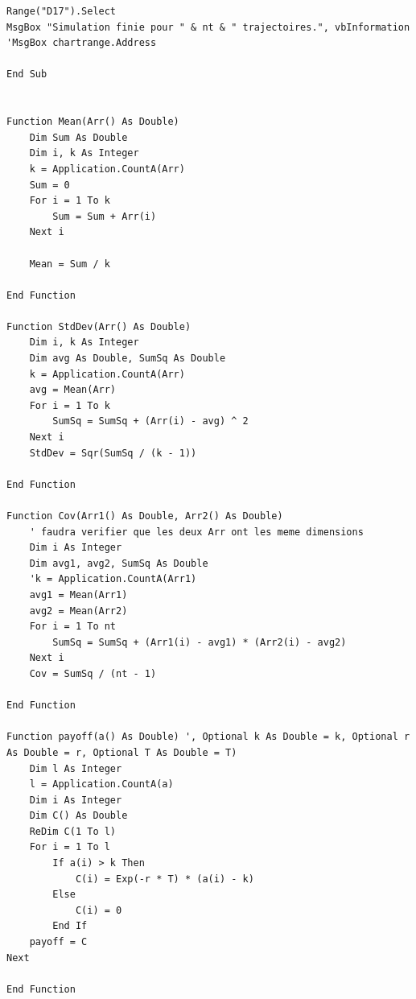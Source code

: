 \documentclass[a4paper,12pt]{scrartcl}
\begin{document}
\begin{lstlisting}
Range("D17").Select
MsgBox "Simulation finie pour " & nt & " trajectoires.", vbInformation
'MsgBox chartrange.Address

End Sub


Function Mean(Arr() As Double)
    Dim Sum As Double
    Dim i, k As Integer
    k = Application.CountA(Arr)
    Sum = 0
    For i = 1 To k
        Sum = Sum + Arr(i)
    Next i
 
    Mean = Sum / k

End Function

Function StdDev(Arr() As Double)
    Dim i, k As Integer
    Dim avg As Double, SumSq As Double
    k = Application.CountA(Arr)
    avg = Mean(Arr)
    For i = 1 To k
        SumSq = SumSq + (Arr(i) - avg) ^ 2
    Next i
    StdDev = Sqr(SumSq / (k - 1))

End Function

Function Cov(Arr1() As Double, Arr2() As Double)
    ' faudra verifier que les deux Arr ont les meme dimensions
    Dim i As Integer
    Dim avg1, avg2, SumSq As Double
    'k = Application.CountA(Arr1)
    avg1 = Mean(Arr1)
    avg2 = Mean(Arr2)
    For i = 1 To nt
        SumSq = SumSq + (Arr1(i) - avg1) * (Arr2(i) - avg2)
    Next i
    Cov = SumSq / (nt - 1)

End Function

Function payoff(a() As Double) ', Optional k As Double = k, Optional r As Double = r, Optional T As Double = T)
    Dim l As Integer
    l = Application.CountA(a)
    Dim i As Integer
    Dim C() As Double
    ReDim C(1 To l)
    For i = 1 To l
        If a(i) > k Then
            C(i) = Exp(-r * T) * (a(i) - k)
        Else
            C(i) = 0
        End If
    payoff = C
Next

End Function
\end{lstlisting}
\end{document}

